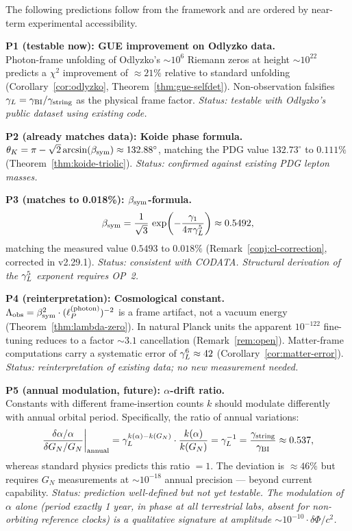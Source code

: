 \begin{corollary}
\label{cor:falsifiable}
The following predictions follow from the framework and are ordered by
near-term experimental accessibility.

\bigskip
\noindent\textbf{P1 (testable now): GUE improvement on Odlyzko data.}\\
Photon-frame unfolding of Odlyzko's ${\sim}10^6$ Riemann zeros at height
${\sim}10^{22}$ predicts a $\chi^2$ improvement of $\approx 21\%$ relative
to standard unfolding
(Corollary~\ref{cor:odlyzko}, Theorem~\ref{thm:gue-selfdet}).
Non-observation falsifies $\gamma_L = \gamma_{\mathrm{BI}}/\gamma_{\mathrm{string}}$ as the physical frame factor.
\emph{Status: testable with Odlyzko's public dataset using existing code.}

\bigskip
\noindent\textbf{P2 (already matches data): Koide phase formula.}\\
$\theta_K = \pi - \sqrt{2}\arcsin(\beta_{\mathrm{sym}}) \approx 132.88^\circ$, matching
the PDG value $132.73^\circ$ to $0.111\%$
(Theorem~\ref{thm:koide-triolic}).
\emph{Status: confirmed against existing PDG lepton masses.}

\bigskip
\noindent\textbf{P3 (matches to 0.018\%): $\beta_{\mathrm{sym}}$-formula.}\\
\[
  \beta_{\mathrm{sym}} = \frac{1}{\sqrt{3}}\,\exp\!\left(-\frac{\gamma_1}{4\pi\gamma_L^5}\right)
  \approx 0.5492,
\]
matching the measured value $0.5493$ to $0.018\%$
(Remark~\ref{conj:cl-correction}, corrected in v2.29.1).
\emph{Status: consistent with CODATA. Structural derivation of the $\gamma_L^5$
exponent requires OP~2.}

\bigskip
\noindent\textbf{P4 (reinterpretation): Cosmological constant.}\\
$\Lambda_{\mathrm{obs}} = \beta_{\mathrm{sym}}^2 \cdot (\ell_P^{(\mathrm{photon})})^{-2}$
is a frame artifact, not a vacuum energy (Theorem~\ref{thm:lambda-zero}).
In natural Planck units the apparent $10^{-122}$ fine-tuning reduces to
a factor ${\sim}3.1$ cancellation (Remark~\ref{rem:open}).
Matter-frame computations carry a systematic error of $\gamma_L^6 \approx 42$
(Corollary~\ref{cor:matter-error}).
\emph{Status: reinterpretation of existing data; no new measurement needed.}

\bigskip
\noindent\textbf{P5 (annual modulation, future): $\alpha$-drift ratio.}\\
Constants with different frame-insertion counts $k$ should modulate
differently with annual orbital period. Specifically, the ratio of
annual variations:
\[
  \frac{\delta\alpha/\alpha}{\delta G_N/G_N}\bigg|_{\mathrm{annual}}
  = \gamma_L^{k(\alpha)-k(G_N)} \cdot \frac{k(\alpha)}{k(G_N)}
  = \gamma_L^{-1} = \frac{\gamma_{\mathrm{string}}}{\gamma_{\mathrm{BI}}} \approx 0.537,
\]
whereas standard physics predicts this ratio $= 1$.
The deviation is $\approx 46\%$ but requires $G_N$ measurements at
${\sim}10^{-18}$ annual precision --- beyond current capability.
\emph{Status: prediction well-defined but not yet testable. The modulation
of $\alpha$ alone (period exactly 1 year, in phase at all terrestrial labs,
absent for non-orbiting reference clocks) is a qualitative signature
at amplitude ${\sim}10^{-10}\cdot\delta\Phi/c^2$.}


\end{corollary}
